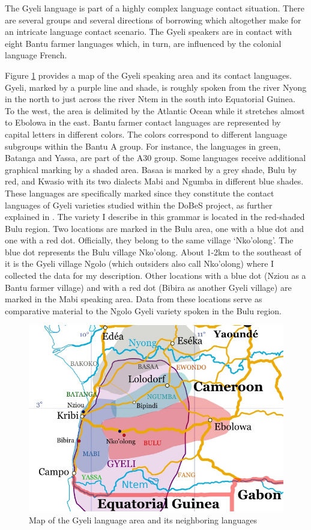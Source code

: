 The Gyeli language is part of a highly complex language contact situation. There are several groups and several directions of borrowing  which altogether make for an intricate language contact scenario. The Gyeli speakers are in contact with eight Bantu farmer languages which, in turn, are influenced by the colonial language French. 

Figure \ref{Fig:Gyeli-map} provides a map of the Gyeli speaking area and its contact languages. Gyeli, marked by a purple line and shade, is roughly spoken from the river Nyong in the north to just across the river Ntem in the south into Equatorial Guinea. To the west, the area is delimited by the Atlantic Ocean while it stretches almost to Ebolowa in the east. Bantu farmer contact languages are represented by capital letters in different colors. The colors correspond to different language subgroups within the Bantu A group. For instance, the languages in green, Batanga and Yassa, are part of the A30 group. Some languages receive additional graphical marking by a shaded area.  Basaa is marked by a grey shade, Bulu by red, and Kwasio with its two dialects Mabi and Ngumba in different blue shades. These languages are specifically marked since they constitute the contact languages of Gyeli varieties studied within the DoBeS project, as further explained in . The variety I describe in this grammar is located in the red-shaded Bulu region. Two locations are marked in the Bulu area, one with a blue dot and one with a red dot. Officially, they belong to the same village `Nko'olong'. The blue dot represents the Bulu village Nko'olong. About 1-2km to the southeast of it is the Gyeli village Ngolo (which outsiders also call Nko'olong) where I collected the data for my description. Other locations with a blue dot (Nziou as a Bantu farmer village) and with a red dot (Bibira as another Gyeli village) are marked in the Mabi speaking area. Data from these locations serve as comparative material to the Ngolo Gyeli variety spoken in the Bulu region.

\begin{figure}[!h]
\includegraphics[width=\textwidth]{figures/Gyeli-map.jpg}
\caption{Map of the Gyeli language area and its neighboring languages}
\label{Fig:Gyeli-map}
\end{figure}

